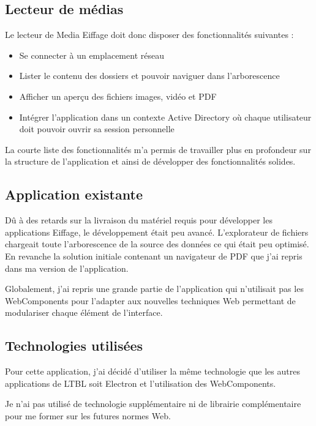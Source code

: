 \clearpage

\subsection{Lecteur de médias}

Le lecteur de Media Eiffage doit donc disposer des fonctionnalités suivantes :

\begin{itemize}
    \item Se connecter à un emplacement réseau
    \item Lister le contenu des dossiers et pouvoir naviguer dans l'arborescence
    \item Afficher un aperçu des fichiers images, vidéo et PDF
    \item Intégrer l'application dans un contexte Active Directory où chaque utilisateur doit pouvoir ouvrir sa session personnelle
\end{itemize}

La courte liste des fonctionnalités m'a permis de travailler plus en profondeur sur la structure de l'application et ainsi de développer des fonctionnalités solides.

\subsection{Application existante}

Dû à des retards sur la livraison du matériel requis pour développer les applications Eiffage, le développement était peu avancé.
L'explorateur de fichiers chargeait toute l'arborescence de la source des données ce qui était peu optimisé.
En revanche la solution initiale contenant un navigateur de PDF que j'ai repris dans ma version de l'application.

Globalement, j'ai repris une grande partie de l'application qui n'utilisait pas les WebComponents pour l'adapter aux nouvelles techniques Web permettant de modulariser chaque élément de l'interface.

\subsection{Technologies utilisées}

Pour cette application, j'ai décidé d'utiliser la même technologie que les autres applications de LTBL soit Electron et l'utilisation des WebComponents.

Je n'ai pas utilisé de technologie supplémentaire ni de librairie complémentaire pour me former sur les futures normes Web.

